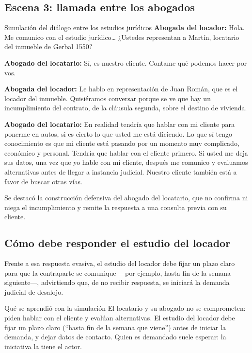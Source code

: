 \documentclass[12pt,oneside]{book}
\begin{document}
\subsection*{Escena 3: llamada entre los abogados}

\begin{example}{Simulación del diálogo entre los estudios jurídicos}
\textbf{Abogada del locador:} Hola. Me comunico con el estudio jurídico… ¿Ustedes representan a Martín, locatario del inmueble de Gerbal 1550?

\textbf{Abogado del locatario:} Sí, es nuestro cliente. Contame qué podemos hacer por vos.

\textbf{Abogada del locador:} Le hablo en representación de Juan Román, que es el locador del inmueble. Quisiéramos conversar porque se ve que hay un incumplimiento del contrato, de la cláusula segunda, sobre el destino de vivienda.

\textbf{Abogado del locatario:} En realidad tendría que hablar con mi cliente para ponerme en autos, si es cierto lo que usted me está diciendo. Lo que sí tengo conocimiento es que mi cliente está pasando por un momento muy complicado, económico y personal. Tendría que hablar con el cliente primero. Si usted me deja sus datos, una vez que yo hable con mi cliente, después me comunico y evaluamos alternativas antes de llegar a instancia judicial. Nuestro cliente también está a favor de buscar otras vías.
\end{example}

Se destacó la construcción defensiva del abogado del locatario, que no confirma ni niega el incumplimiento y remite la respuesta a una consulta previa con su cliente.

\subsection*{Cómo debe responder el estudio del locador}

Frente a esa respuesta evasiva, el estudio del locador debe fijar un plazo claro para que la contraparte se comunique —por ejemplo, hasta fin de la semana siguiente—, advirtiendo que, de no recibir respuesta, se iniciará la demanda judicial de desalojo.

\begin{example}{Qué se aprendió con la simulación}
El locatario y su abogado no se comprometen: piden hablar con el cliente y evalúan alternativas. El estudio del locador debe fijar un plazo claro (``hasta fin de la semana que viene'') antes de iniciar la demanda, y dejar datos de contacto. Quien es demandado suele esperar: la iniciativa la tiene el actor.
\end{example}
\end{document}

